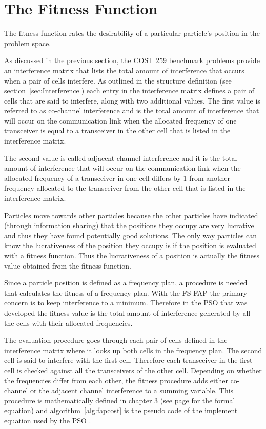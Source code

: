 \section{The Fitness Function}
The fitness function rates the desirability of a particular particle's position in the problem space.

As discussed in the previous section, the COST 259 benchmark problems provide an interference matrix that lists the total amount of interference that occurs when a pair of cells interfere. As outlined in the structure definition (see section~\ref{sec:Interference}) each entry in the interference matrix defines a pair of cells that are said to interfere, along with two additional values. The first value is referred to as co-channel interference and is the total amount of interference that will occur on the communication link when the allocated frequency of one transceiver is equal to a transceiver in the other cell that is listed in the interference matrix. 

The second value is called adjacent channel interference and it is the total amount of interference that will occur on the communication link when the allocated frequency of a transceiver in one cell differs by 1 from another frequency allocated to the transceiver from the other cell that is listed in the interference matrix.

Particles move towards other particles because the other particles have indicated (through information sharing) that the positions they occupy are very lucrative and thus they have found potentially good solutions. The only way particles can know the lucrativeness of the position they occupy is if the position is evaluated with a fitness function. Thus the lucrativeness of a position is actually the fitness value obtained from the fitness function. 

Since a particle position is defined as a frequency plan, a procedure is needed that calculates the fitness of a frequency plan. With the \gls{FS-FAP} the primary concern is to keep interference to a minimum. Therefore in the \gls{PSO} that was developed the fitness value is the total amount of interference generated by all the cells with their allocated frequencies. 

The evaluation procedure goes through each pair of cells defined in the interference matrix where it looks up both cells in the frequency plan. The second cell is said to interfere with the first cell. Therefore each transceiver in the first cell is checked against all the transceivers of the other cell. Depending on whether the frequencies differ from each other, the fitness procedure adds either co-channel or the adjacent channel interference to a summing variable. This procedure is mathematically defined in chapter 3 (see page \pageref{E:costFunction} for the formal equation) and algorithm~\ref{alg:fapcost} is the pseudo code of the implement equation used by the \gls{PSO} . 

